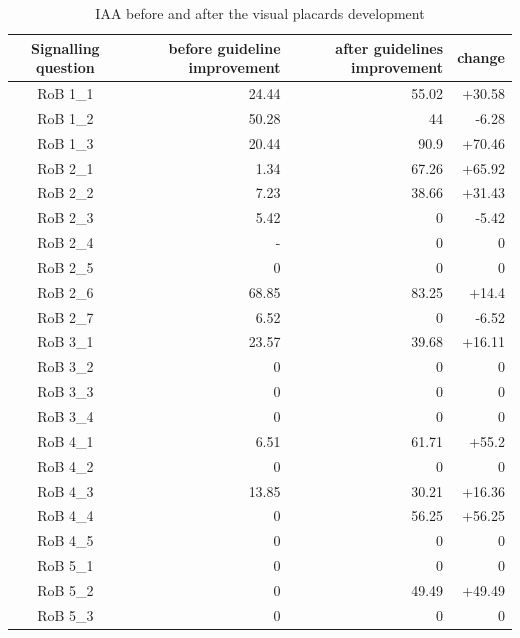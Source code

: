 \documentclass[sn-mathphys,Numbered]{sn-jnl}%
\theoremstyle{thmstyleone}%
\theoremstyle{thmstyletwo}%
\theoremstyle{thmstylethree}%
\begin{document}
\begin{table}[htb]
    \caption{IAA before and after the visual placards development}
    \label{tab:IAA_sq}
    \centering
    \begin{tabular}{crrr}
    \hline
        Signalling question & before guideline improvement & after guidelines improvement & change \\
    \hline
        RoB 1\_1 & 24.44 & 55.02 & +30.58 \\ 
        RoB 1\_2 & 50.28 & 44 & -6.28 \\ 
        RoB 1\_3 & 20.44 & 90.9 & +70.46 \\ 
        RoB 2\_1 & 1.34 & 67.26 & +65.92 \\ 
        RoB 2\_2 & 7.23 & 38.66 & +31.43 \\ 
        RoB 2\_3 & 5.42 & 0 & -5.42 \\ 
        RoB 2\_4 & - & 0 & 0 \\ 
        RoB 2\_5 & 0 & 0 & 0 \\ 
        RoB 2\_6 & 68.85 & 83.25 & +14.4 \\ 
        RoB 2\_7 & 6.52 & 0 & -6.52 \\ 
        RoB 3\_1 & 23.57 & 39.68 & +16.11 \\ 
        RoB 3\_2 & 0 & 0 & 0 \\ 
        RoB 3\_3 & 0 & 0 & 0 \\ 
        RoB 3\_4 & 0 & 0 & 0 \\ 
        RoB 4\_1 & 6.51 & 61.71 & +55.2 \\ 
        RoB 4\_2 & 0 & 0 & 0 \\ 
        RoB 4\_3 & 13.85 & 30.21 & +16.36 \\ 
        RoB 4\_4 & 0 & 56.25 & +56.25 \\ 
        RoB 4\_5 & 0 & 0 & 0 \\ 
        RoB 5\_1 & 0 & 0 & 0 \\ 
        RoB 5\_2 & 0 & 49.49 & +49.49 \\ 
        RoB 5\_3 & 0 & 0 & 0 \\ \hline
    \end{tabular}
\end{table}
%
%
%
\end{document}
